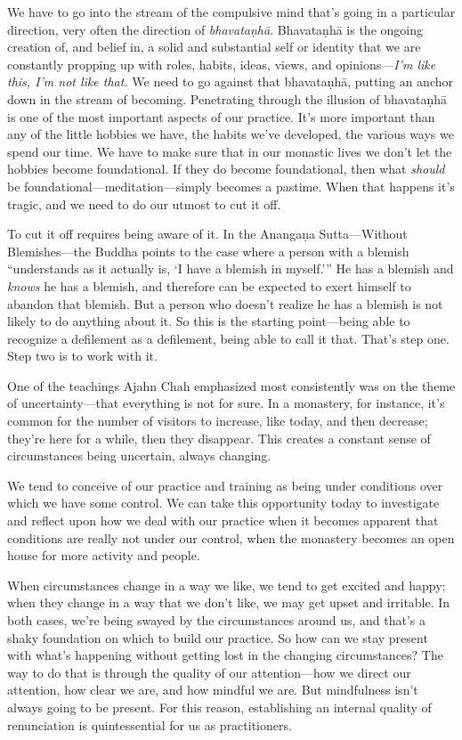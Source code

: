 We have to go into the stream of the compulsive mind that's going in a 
particular direction, very often the direction of \emph{bhavataṇhā}. 
Bhavataṇhā is the ongoing creation of, and belief in, a solid and 
substantial self or identity that we are constantly propping up with 
roles, habits, ideas, views, and opinions---\emph{I'm like this, I'm 
not like that.} We need to go against that bhavataṇhā, putting an 
anchor down in the stream of becoming. Penetrating through the illusion 
of bhavataṇhā is one of the most important aspects of our practice. 
It's more important than any of the little hobbies we have, the habits 
we've developed, the various ways we spend our time. We have to make 
sure that in our monastic lives we don't let the hobbies become 
foundational. If they do become foundational, then what \emph{should} 
be foundational---meditation---simply becomes a pastime. When that 
happens it's tragic, and we need to do our utmost to cut it off.

To cut it off requires being aware of it. In the Anangaṇa 
Sutta---Without Blemishes---the Buddha points to the case where a 
person with a blemish ``understands as it actually is, `I have a 
blemish in myself.'\thinspace'' He has a blemish and \emph{knows} he 
has a blemish, and therefore can be expected to exert himself to 
abandon that blemish. But a person who doesn't realize he has a blemish 
is not likely to do anything about it. So this is the starting 
point---being able to recognize a defilement as a defilement, being 
able to call it that. That's step one. Step two is to work with it.


One of the teachings Ajahn Chah emphasized most consistently was on the 
theme of uncertainty---that everything is not for sure. In a monastery, 
for instance, it's common for the number of visitors to increase, like 
today, and then decrease; they're here for a while, then they 
disappear. This creates a constant sense of circumstances being 
uncertain, always changing.

We tend to conceive of our practice and training as being under 
conditions over which we have some control. We can take this 
opportunity today to investigate and reflect upon how we deal with our 
practice when it becomes apparent that conditions are really not under 
our control, when the monastery becomes an open house for more activity 
and people.

When circumstances change in a way we like, we tend to get excited and
happy; when they change in a way that we don't like, we may get upset
and irritable. In both cases, we're being swayed by the circumstances
around us, and that's a shaky foundation on which to build our practice.
So how can we stay present with what's happening without getting lost in
the changing circumstances? The way to do that is through the quality of
our attention---how we direct our attention, how clear we are, and how
mindful we are. But mindfulness isn't always going to be present. For
this reason, establishing an \mbox{internal} quality of renunciation is
quintessential for us as practitioners.

